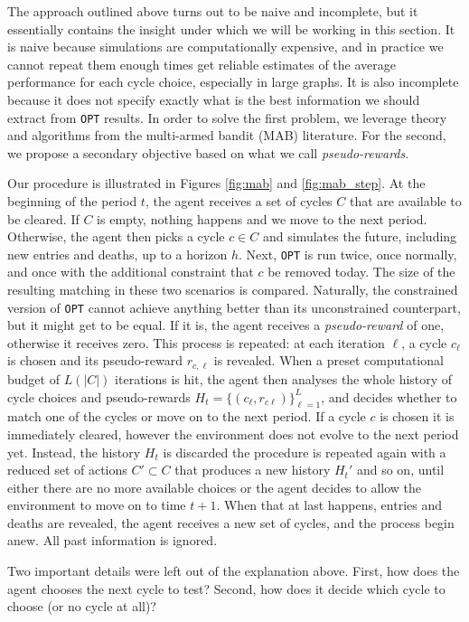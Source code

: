 \documentclass[12pt]{article}
\begin{document}
The approach outlined above turns out to be naive and incomplete, but it essentially contains the insight under which we will be working in this section. It is naive because simulations are computationally expensive, and in practice we cannot repeat them enough times get reliable estimates of the average performance for each cycle choice, especially in large graphs. It is also incomplete because it does not specify exactly what is the best information we should extract from \texttt{OPT} results. In order to solve the first problem, we leverage theory and algorithms from the multi-armed bandit (MAB) literature. For the second, we propose a secondary objective based on what we call \emph{pseudo-rewards}.

Our procedure is illustrated in Figures \ref{fig:mab} and \ref{fig:mab_step}. At the beginning of the period $t$, the agent receives a set of cycles $C$ that are available to be cleared. If $C$ is empty, nothing happens and we move to the next period. Otherwise, the agent then picks a cycle $c \in C$ and simulates the future, including new entries and deaths, up to a horizon $h$. Next, \texttt{OPT} is run twice, once normally, and once with the additional constraint that $c$ be removed today. The size of the resulting matching in these two scenarios is compared. Naturally, the constrained version of \texttt{OPT} cannot achieve anything better than its unconstrained counterpart, but it might get to be equal. If it is, the agent receives a \emph{pseudo-reward} of one, otherwise it receives zero. This process is repeated: at each iteration $\ell$, a cycle $c_{\ell}$ is chosen and its pseudo-reward $r_{c, \ell}$ is revealed. When a preset computational budget of $L(|C|)$ iterations is hit, the agent then analyses the whole history of cycle choices and pseudo-rewards $H_{t} = \{ (c_{\ell}, r_{c\ell} ) \}_{\ell=1}^{L}$, and decides whether to match one of the cycles or move on to the next period. If a cycle $c$ is chosen it is immediately cleared, however the environment does not evolve to the next period yet. Instead, the history $H_t$ is discarded the procedure is repeated again with a reduced set of actions $C' \subset C$ that produces a new history $H_t'$ and so on, until either there are no more available choices or the agent decides to allow the environment to move on to time $t+1$. When that at last happens, entries and deaths are revealed, the agent receives a new set of cycles, and the process begin anew. All past information is ignored.


Two important details were left out of the explanation above. First, how does the agent chooses the next cycle to test? Second, how does it decide which cycle to choose (or no cycle at all)? 
\end{document}
